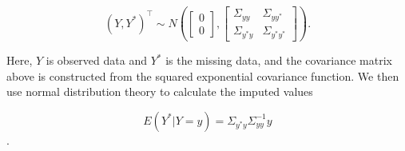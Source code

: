 \documentclass[12pt]{article}
\begin{document}
\[ 
(Y,Y^*)^\top \sim N\left( \begin{bmatrix} 0 \\ 0 \end{bmatrix}, \begin{bmatrix} \Sigma_{yy} & \Sigma_{yy^*} \\ \Sigma_{y^*y} & \Sigma_{y^*y^*}\end{bmatrix} \right).
\]

\noindent Here, \(Y\) is observed data and \(Y^*\) is the missing data,
and the covariance matrix above is constructed from the squared
exponential covariance function. We then use normal distribution theory
to calculate the imputed values

\[ E(Y^*|Y = y) = \Sigma_{y^*y} \Sigma_{yy}^{-1}y \].



\end{document}
